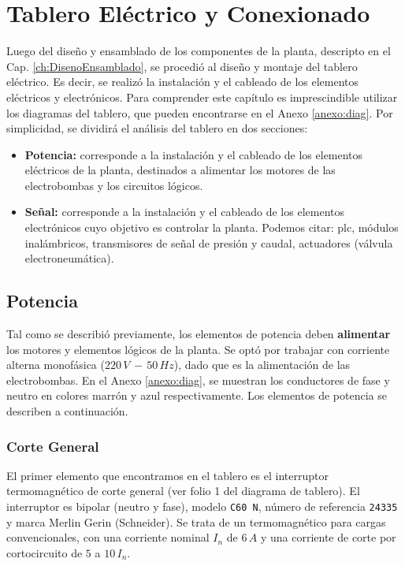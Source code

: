 \chapter{Tablero Eléctrico y Conexionado}
\label{ch:tablero}

Luego del diseño y ensamblado de los componentes de la planta, descripto en el
Cap.
\ref{ch:DisenoEnsamblado}, se procedió al diseño y montaje del
tablero eléctrico.
Es decir, se realizó la instalación y el cableado de los elementos eléctricos y
electrónicos.
Para comprender este capítulo es imprescindible utilizar los diagramas
del tablero, que pueden encontrarse en el Anexo \ref{anexo:diag}.
Por simplicidad, se dividirá el análisis del tablero en dos secciones:
\begin{itemize}
 \item \textbf{Potencia:} corresponde a la instalación y el cableado
 de los elementos eléctricos de la planta, destinados a alimentar los motores de
 las electrobombas y los circuitos lógicos.
 \item \textbf{Señal:} corresponde a la instalación y el cableado
 de los elementos electrónicos cuyo objetivo es controlar la planta.
 Podemos citar: \gls{plc}, módulos inalámbricos,
 transmisores de señal de presión y caudal, actuadores (válvula electroneumática).
\end{itemize}

\section{Potencia}
\label{sec:Potencia}
Tal como se describió previamente, los elementos de potencia deben
\textbf{alimentar} los motores y elementos lógicos de la planta.
Se optó por trabajar con corriente alterna monofásica ($220\,V\,-\,50\,Hz$),
dado que es la alimentación de las electrobombas.
En el Anexo \ref{anexo:diag}, se muestran los conductores de fase y neutro en
colores marrón y azul respectivamente.
Los elementos de potencia se describen a continuación.

\subsection{Corte General}
\label{subsec:corteGeneral}
El primer elemento que encontramos en el tablero es el interruptor
termomagnético de corte general (ver folio 1 del diagrama de tablero).
El interruptor es bipolar (neutro y fase), modelo \verb|C60 N|, número de
referencia \verb|24335| y marca Merlin Gerin (Schneider).
Se trata de un termomagnético para cargas convencionales, con una corriente
nominal $I_n$ de $6\,A$ y una corriente de corte por cortocircuito de $5$ a
$10\,I_n$.

